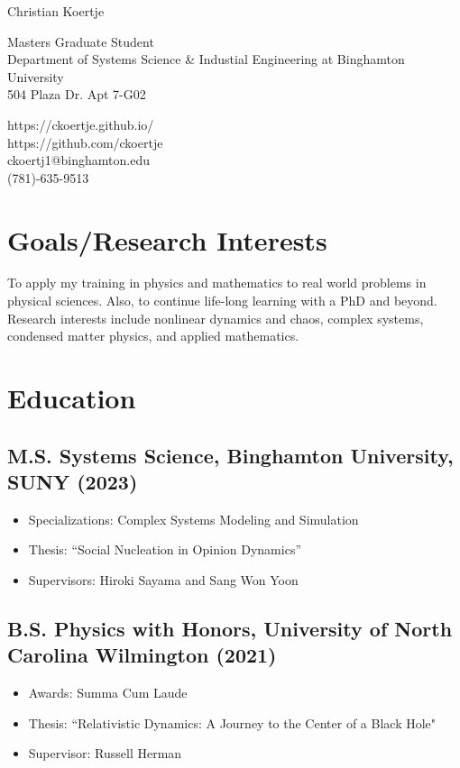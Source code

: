 \documentclass[12pt]{article}
\begin{document}
{\Huge Christian Koertje}

\begin{multicols}{2}
    Masters Graduate Student \\
    Department of Systems Science \& Industial Engineering at Binghamton University \\
    504 Plaza Dr. Apt 7-G02

    \columnbreak
    https://ckoertje.github.io/ \\
    https://github.com/ckoertje \\
    ckoertj1@binghamton.edu \\
    (781)-635-9513
\end{multicols}

\section{Goals/Research Interests}
To apply my training in physics and mathematics to real world problems in physical sciences. Also, to continue life-long learning with a PhD and beyond. Research interests include nonlinear dynamics and chaos, complex systems, condensed matter physics, and applied mathematics.

\section{Education}
\subsection{\textbf{M.S. Systems Science}, Binghamton University, SUNY \hfill (2023)}
\begin{itemize}
    \itemsep = 0em
    \item[] Specializations: Complex Systems Modeling and Simulation
    \item[] Thesis: ``Social Nucleation in Opinion Dynamics''
    \item[] Supervisors: Hiroki Sayama and Sang Won Yoon
\end{itemize}

\subsection{\textbf{B.S. Physics with Honors}, University of North Carolina Wilmington \hfill (2021)}
\begin{itemize}
    \itemsep = 0em
    \item[] Awards: Summa Cum Laude
    \item[] Thesis: ``Relativistic Dynamics: A Journey to the Center of a Black Hole"
    \item[] Supervisor: Russell Herman
\end{itemize}
\end{document}
